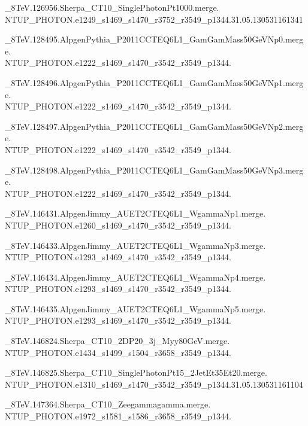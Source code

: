 \_8TeV.126956.Sherpa\_CT10\_SinglePhotonPt1000.merge. \\NTUP\_PHOTON.e1249\_s1469\_s1470\_r3752\_r3549\_p1344.31.05.130531161341

\_8TeV.128495.AlpgenPythia\_P2011CCTEQ6L1\_GamGamMass50GeVNp0.merge. \\NTUP\_PHOTON.e1222\_s1469\_s1470\_r3542\_r3549\_p1344.

\_8TeV.128496.AlpgenPythia\_P2011CCTEQ6L1\_GamGamMass50GeVNp1.merge. \\NTUP\_PHOTON.e1222\_s1469\_s1470\_r3542\_r3549\_p1344.

\_8TeV.128497.AlpgenPythia\_P2011CCTEQ6L1\_GamGamMass50GeVNp2.merge. \\NTUP\_PHOTON.e1222\_s1469\_s1470\_r3542\_r3549\_p1344.

\_8TeV.128498.AlpgenPythia\_P2011CCTEQ6L1\_GamGamMass50GeVNp3.merge. \\NTUP\_PHOTON.e1222\_s1469\_s1470\_r3542\_r3549\_p1344.

\_8TeV.146431.AlpgenJimmy\_AUET2CTEQ6L1\_WgammaNp1.merge. \\NTUP\_PHOTON.e1260\_s1469\_s1470\_r3542\_r3549\_p1344.

\_8TeV.146433.AlpgenJimmy\_AUET2CTEQ6L1\_WgammaNp3.merge. \\NTUP\_PHOTON.e1293\_s1469\_s1470\_r3542\_r3549\_p1344.

\_8TeV.146434.AlpgenJimmy\_AUET2CTEQ6L1\_WgammaNp4.merge. \\NTUP\_PHOTON.e1293\_s1469\_s1470\_r3542\_r3549\_p1344.

\_8TeV.146435.AlpgenJimmy\_AUET2CTEQ6L1\_WgammaNp5.merge. \\NTUP\_PHOTON.e1293\_s1469\_s1470\_r3542\_r3549\_p1344.

\_8TeV.146824.Sherpa\_CT10\_2DP20\_3j\_Myy80GeV.merge. \\NTUP\_PHOTON.e1434\_s1499\_s1504\_r3658\_r3549\_p1344.

\_8TeV.146825.Sherpa\_CT10\_SinglePhotonPt15\_2JetEt35Et20.merge. \\NTUP\_PHOTON.e1310\_s1469\_s1470\_r3542\_r3549\_p1344.31.05.130531161104

\_8TeV.147364.Sherpa\_CT10\_Zeegammagamma.merge. \\NTUP\_PHOTON.e1972\_s1581\_s1586\_r3658\_r3549\_p1344.

